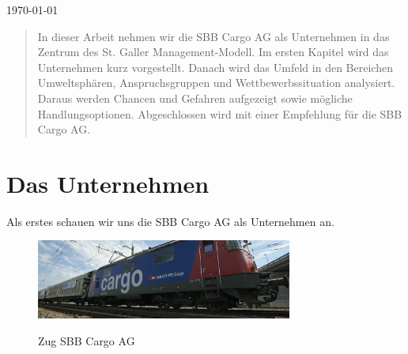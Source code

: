 \documentclass{article}
\begin{document}
\begin{titlepage}

{\large \today}\\[2cm] %


    

\vfill %

\end{titlepage}

\setcounter{page}{2}

\begin{abstract}
In dieser Arbeit nehmen wir die SBB Cargo AG als Unternehmen in das Zentrum des St. Galler Management-Modell.
Im ersten Kapitel wird das Unternehmen kurz vorgestellt.
Danach wird das Umfeld in den Bereichen Umweltsphären, Anspruchsgruppen und Wettbewerbssituation analysiert.
Daraus werden Chancen und Gefahren aufgezeigt sowie mögliche Handlungsoptionen.
Abgeschlossen wird mit einer Empfehlung für die SBB Cargo AG.
\end{abstract}

\tableofcontents

\newpage

\section{Das Unternehmen}

Als erstes schauen wir uns die SBB Cargo AG als Unternehmen an.

\begin{figure}[htbp] %
    \centering
    \includegraphics[width=0.75\textwidth]{sbbcargoag} %
    \caption{Zug SBB Cargo AG}\parencite[o. S.]{sbbcargoagBild}
    \label{fig:bildlabel2}
\end{figure}
\end{document}
